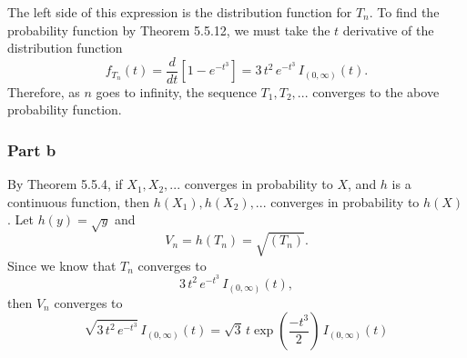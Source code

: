 \documentclass{article}
\begin{document}
The left side of this expression is the distribution function for $T_n$. To find the probability function by Theorem 5.5.12, we must take the $t$ derivative of the distribution function
\[f_{T_n}(t) = \frac{d}{dt}\left[1 - e^{-t^3}\right] = 3\,t^2\,e^{-t^3}\,I_{(0,\infty)}(t).\]
Therefore, as $n$ goes to infinity, the sequence $T_1, T_2, ...$ converges to the above probability function. 

\subsubsection*{Part b}
By Theorem 5.5.4, if $X_1, X_2, ...$ converges in probability to $X$, and $h$ is a continuous function, then $h(X_1), h(X_2), ...$ converges in probability to $h(X)$. Let $h(y) = \sqrt{y}$ and 
\[V_n = h(T_n) = \sqrt{(T_n)}.\] Since we know that $T_n$ converges to 
\[3\,t^2\,e^{-t^3}\,I_{(0,\infty)}(t),\] then $V_n$ converges to 
\[\sqrt{ 3\,t^2\,e^{-t^3}}\,I_{(0,\infty)}(t) = \sqrt{3}\,t\exp{\left(\frac{-t^3}{2}\right)}\,I_{(0,\infty)}(t)\]




\iffalse
Since the $X_i$ are independent of each other, the probability that all $X_i$ in the series $X_1, X_2, ... , X_n$ are less than $x$ is \[P\left(\text{max}\{X_1, ... , X_n\} < x\right) = \left((x-1)^3 + 1\right)^n.\]
This is the definition of a distribution function 
\[F_{\text{max}}(x) = \begin{cases}
0, &x < 0 \\
\left((x-1)^3 + 1\right)^n, &0\leq x \leq1 \\
1, & x > 1.\end{cases}\] The limit of this distribution in $n$ is 
\[F_{\text{max}}(x) = \begin{cases}
0, &x < 1 \\1, & x \geq 1.\end{cases}\]
\fi

\iffalse
, we can determine the probability that any one $_i$ is more than $\epsilon$ away from the maximum possible value, $1$. We can say that for all $X_i$ with $0<i<n$,
\[ P(X_i \leq 1 - \epsilon) = \left((1-\epsilon)-1\right)^3+1 = 1 - \epsilon^3\] for $x = 1 - \epsilon; \,\,0 \leq \epsilon \leq 1$. Since the $X_i$ are independent of each other, the probability that all $X_i$ in the series $X_1, X_2, ... , X_n$ are less than $1-\epsilon$ is \[P\left(\text{max}\{X_1, ... , X_n\} < 1 - \epsilon\right) = \left(1-\epsilon^3\right)^n.\]
This is the definition of a distribution function \[F_{\text{max}}(1-\epsilon) = \left(1-\epsilon^3\right)^n\,I_\epsilon(0,1).\] The distribution function for $T_n$ can thus be obtained as 
\[T_n(1-\epsilon) = n^{1/3}\left(1-\left(1-\epsilon^3\right)^n\right)\,I_\epsilon(0,1).\]
\fi
\end{document}
